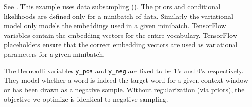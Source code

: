 See .
%
This example uses data subsampling (). The
priors and conditional likelihoods are defined only for a minibatch of
data. Similarly the variational model only models the embeddings used
in a given minibatch. TensorFlow variables contain the embedding
vectors for the entire vocabulary. TensorFlow placeholders ensure that
the correct embedding vectors are used as variational parameters for a
given minibatch.

The Bernoulli variables \texttt{y_pos} and \texttt{y_neg} are fixed to
be $1$'s and $0$'s respectively. They model whether a word is indeed the target word
for a given context window or has been drawn as a negative sample.
Without regularization (via priors), the objective we optimize is
identical to negative sampling.
